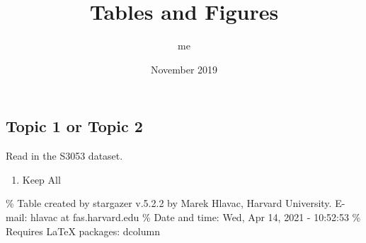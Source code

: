 \documentclass[
]{article}
\title{Tables and Figures}
\author{me}
\date{November 2019}
\providecommand{\tightlist}{%
  \setlength{\itemsep}{0pt}\setlength{\parskip}{0pt}}
\begin{document}
\maketitle

\hypertarget{topic-1-or-topic-2}{%
\subsection{Topic 1 or Topic 2}\label{topic-1-or-topic-2}}

Read in the S3053 dataset.

\begin{enumerate}
\def\labelenumi{\arabic{enumi}.}
\tightlist
\item
  Keep All
\end{enumerate}

\% Table created by stargazer v.5.2.2 by Marek Hlavac, Harvard
University. E-mail: hlavac at fas.harvard.edu \% Date and time: Wed, Apr
14, 2021 - 10:52:53 \% Requires LaTeX packages: dcolumn
\end{document}
